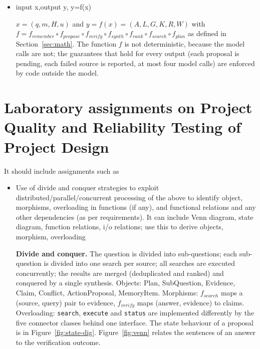 \documentclass[oneside,a4paper,12pt]{report}
\begin{document}
\begin{appendices}
\begin{itemize}
\textbf{Retrieval policy.} Choosing which tool to call, with which query and at what granularity, over several turns, is a sequential decision problem under uncertainty; GRASP~\cite{grasp2026} learns such a policy with reinforcement learning. Cortex replaces the policy by a fixed plan of at most five sub-questions and one bounded retry, so the number of steps is constant.

\textbf{Complexity of one run.} With $|C|$ sources, $p \le 5$ sub-questions, $N$ evidence items, $|A|$ answer tokens and a constant number of model calls (at most 4), the run takes $O(p\,|C| + N \log N + |L| \cdot (|c| + |E_c|))$ work besides the model and tool calls, i.e. polynomial time. The problem as implemented is therefore in class P, with model and tool calls treated as bounded oracle calls.

\item input x,output y, y=f(x)

$x = (q, m, H, u)$ and $y = f(x) = (A, L, G, K, R, W)$ with
$f = f_{\mathit{remember}} \circ f_{\mathit{propose}} \circ f_{\mathit{verify}} \circ f_{\mathit{synth}} \circ f_{\mathit{rank}} \circ f_{\mathit{search}} \circ f_{\mathit{plan}}$ as defined in Section~\ref{sec:math}. The function $f$ is not deterministic, because the model calls are not; the guarantees that hold for every output (each proposal is pending, each failed source is reported, at most four model calls) are enforced by code outside the model.
\end{itemize}

\chapter{Laboratory assignments on Project Quality and Reliability Testing of Project Design}
\label{app:quality}

It should include assignments such as
\begin{itemize}
\item Use of divide and conquer strategies to exploit distributed/parallel/concurrent processing of the above to identify object, morphisms, overloading in functions (if any), and functional relations and any other dependencies (as per requirements).
             It can include Venn diagram, state diagram, function relations, i/o relations; use this to derive objects, morphism, overloading

\textbf{Divide and conquer.} The question is divided into sub-questions; each sub-question is divided into one search per source; all searches are executed concurrently; the results are merged (deduplicated and ranked) and conquered by a single synthesis. Objects: Plan, SubQuestion, Evidence, Claim, Conflict, ActionProposal, MemoryItem. Morphisms: $f_{\mathit{search}}$ maps a (source, query) pair to evidence, $f_{\mathit{verify}}$ maps (answer, evidence) to claims. Overloading: \texttt{search}, \texttt{execute} and \texttt{status} are implemented differently by the five connector classes behind one interface. The state behaviour of a proposal is in Figure~\ref{fig:state-dig}. Figure~\ref{fig:venn} relates the sentences of an answer to the verification outcome.


\end{itemize}
\end{appendices}
\end{document}
